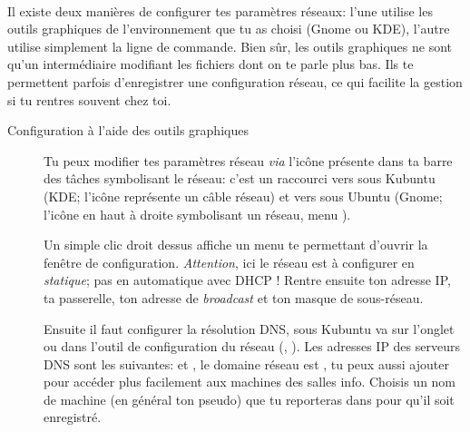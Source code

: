 \paragraph{}
\label{Ubuntu:IP}
Il existe deux manières de configurer tes paramètres réseaux: l'une utilise les outils graphiques de l'environnement que tu as choisi (Gnome ou KDE), l'autre utilise simplement la ligne de commande. Bien sûr, les outils graphiques ne sont qu'un intermédiaire modifiant les fichiers dont on te parle plus bas. Ils te permettent parfois d'enregistrer une configuration réseau, ce qui facilite la gestion si tu rentres souvent chez toi.

\begin{description}
\item[Configuration à l'aide des outils graphiques]
Tu peux modifier tes paramètres réseau \emph{via} l'icône présente dans ta barre des tâches symbolisant le réseau: c'est un raccourci vers  sous Kubuntu (KDE; l'icône représente un c\^able réseau) et vers  sous Ubuntu (Gnome; l'icône en haut à droite symbolisant un réseau, menu ).

Un simple clic droit dessus affiche un menu te permettant d'ouvrir la fenêtre de configuration. \emph{Attention}, ici le réseau est à configurer en \emph{statique}; pas en automatique avec DHCP ! Rentre ensuite ton adresse IP, ta passerelle, ton adresse de \emph{broadcast} et ton masque de sous-réseau.

Ensuite il faut configurer la résolution DNS, sous Kubuntu va sur l'onglet  ou dans l'outil de configuration du réseau
(, ). Les adresses IP des serveurs DNS sont les suivantes:  et , le domaine réseau
est , tu peux aussi ajouter  pour accéder plus facilement aux machines des salles info. Choisis un nom de machine
(en général ton pseudo) que tu reporteras dans  pour qu'il soit enregistré.




\end{description}
